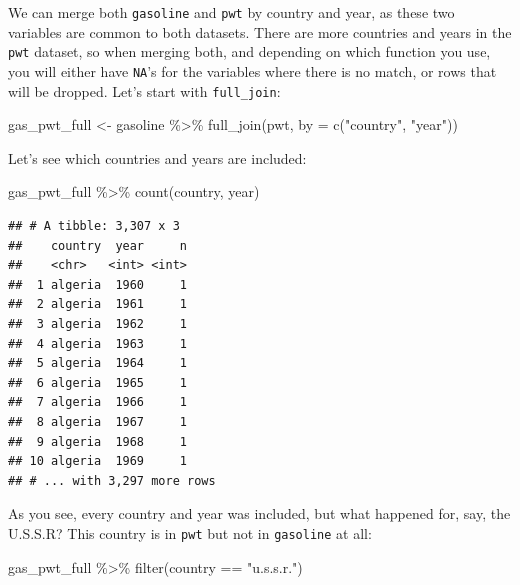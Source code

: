 \documentclass[
]{article}
\newenvironment{Shaded}{\begin{snugshade}}{\end{snugshade}}
\newcommand{\AttributeTok}[1]{\textcolor[rgb]{0.77,0.63,0.00}{#1}}
\newcommand{\FunctionTok}[1]{\textcolor[rgb]{0.00,0.00,0.00}{#1}}
\newcommand{\NormalTok}[1]{#1}
\newcommand{\OtherTok}[1]{\textcolor[rgb]{0.56,0.35,0.01}{#1}}
\newcommand{\SpecialCharTok}[1]{\textcolor[rgb]{0.00,0.00,0.00}{#1}}
\newcommand{\StringTok}[1]{\textcolor[rgb]{0.31,0.60,0.02}{#1}}
\begin{document}
We can merge both \texttt{gasoline} and \texttt{pwt} by country and year, as these two variables are common to
both datasets. There are more countries and years in the \texttt{pwt} dataset, so when merging both, and
depending on which function you use, you will either have \texttt{NA}'s for the variables where there is
no match, or rows that will be dropped. Let's start with \texttt{full\_join}:

\begin{Shaded}
\begin{Highlighting}[]
\NormalTok{gas\_pwt\_full }\OtherTok{\textless{}{-}}\NormalTok{ gasoline }\SpecialCharTok{\%\textgreater{}\%}
  \FunctionTok{full\_join}\NormalTok{(pwt, }\AttributeTok{by =} \FunctionTok{c}\NormalTok{(}\StringTok{"country"}\NormalTok{, }\StringTok{"year"}\NormalTok{))}
\end{Highlighting}
\end{Shaded}

Let's see which countries and years are included:

\begin{Shaded}
\begin{Highlighting}[]
\NormalTok{gas\_pwt\_full }\SpecialCharTok{\%\textgreater{}\%}
  \FunctionTok{count}\NormalTok{(country, year)}
\end{Highlighting}
\end{Shaded}

\begin{verbatim}
## # A tibble: 3,307 x 3
##    country  year     n
##    <chr>   <int> <int>
##  1 algeria  1960     1
##  2 algeria  1961     1
##  3 algeria  1962     1
##  4 algeria  1963     1
##  5 algeria  1964     1
##  6 algeria  1965     1
##  7 algeria  1966     1
##  8 algeria  1967     1
##  9 algeria  1968     1
## 10 algeria  1969     1
## # ... with 3,297 more rows
\end{verbatim}

As you see, every country and year was included, but what happened for, say, the U.S.S.R? This country
is in \texttt{pwt} but not in \texttt{gasoline} at all:

\begin{Shaded}
\begin{Highlighting}[]
\NormalTok{gas\_pwt\_full }\SpecialCharTok{\%\textgreater{}\%}
  \FunctionTok{filter}\NormalTok{(country }\SpecialCharTok{==} \StringTok{"u.s.s.r."}\NormalTok{)}
\end{Highlighting}
\end{Shaded}
\end{document}
